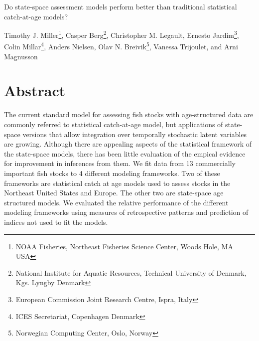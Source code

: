 \documentclass[12pt,letterpaper, leqno]{article}
\begin{document}


\pagestyle{plain}

\begin{titlepage}\center \large

\vspace{144pt}

Do state-space assessment models perform better than traditional statistical catch-at-age models?

\vspace{144pt}

Timothy J. Miller\footnote{NOAA Fisheries, Northeast Fisheries Science Center, Woods Hole, MA USA}, 
Casper Berg\footnote{National Institute for Aquatic Resources, Technical University of Denmark, Kgs. Lyngby
Denmark}, 
Christopher M. Legault\footnotemark[1], 
Ernesto Jardim\footnote{European Commission Joint Research Centre, Ispra, Italy}, 
Colin Millar\footnote{ICES Secretariat, Copenhagen Denmark},
Anders Nielsen\footnotemark[2], 
Olav N. Breivik\footnote{Norwegian Computing Center, Oslo, Norway}, 
Vanessa Trijoulet\footnotemark[2], and 
Arni Magnusson\footnotemark[4]
\end{titlepage}

\setcounter{page}{2}
\linenumbers

\cfoot{\thepage}

\setcounter{page}{2}
\def\fourteenbold{\fontseries{b}\fontsize{14pt}{12pt}\selectfont}
\def\twelvebold{\fontseries{b}\fontsize{12pt}{12pt}\selectfont}
\def\twelveit{\fontshape{it}\fontseries{m}\fontsize{12pt}{12pt}\selectfont}
\sectionfont{\fourteenbold}
\subsectionfont{\twelvebold}
\subsectionfont{\twelvebold}
\subsubsectionfont{\twelveit}

\setcounter{footnote}{0}


\section*{Abstract}

The current standard model for assessing fish stocks with age-structured data are commonly referred to statistical catch-at-age model, but applications of state-space versions that allow integration over temporally stochastic latent variables are growing. Although there are appealing aspects of the statistical framework of the state-space models, there has been little evaluation of the empical evidence for improvement in inferences from them. We fit data from 13 commercially important fish stocks to 4 different modeling frameworks. Two of these frameworks are statistical catch at age models used to assess stocks in the Northeast United States and Europe. The other two are state-space age structured models. We evaluated the relative performance of the different modeling frameworks using measures of retrospective patterns and prediction of indices not used to fit the models.
\end{document}
